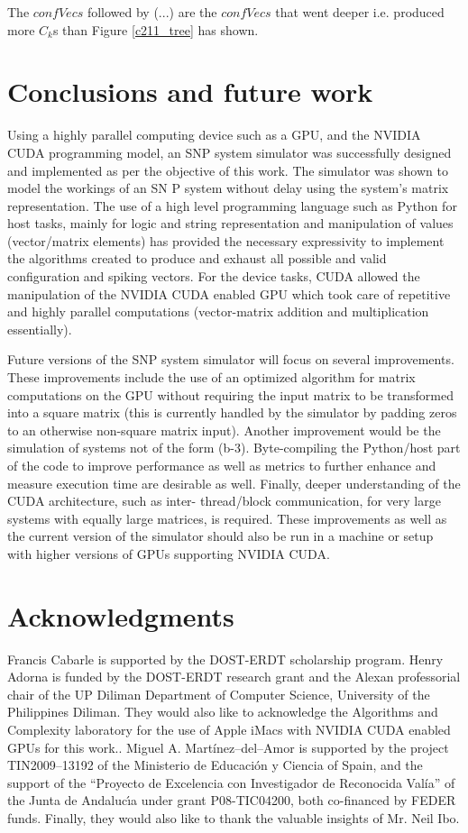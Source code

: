 \documentclass{svmultm}
\begin{document}
The $confVecs$ followed by (...) are the $confVecs$ that went deeper i.e. produced more $C_k$s than Figure \ref{c211_tree} has shown.


\section{Conclusions and future work}
Using a highly parallel computing device such as a  {GPU}, {and the}
 NVIDIA CUDA {programming model}, an SNP system simulator was
successfully designed and implemented as per the objective of this work. The simulator was shown to model the workings of an SN P system without delay using the system's matrix representation. The use of a high
level programming language such as Python for host tasks,
mainly for logic and string representation and manipulation
of values (vector/matrix elements) {has} provided the necessary
expressivity to implement the algorithms created to produce
and exhaust all possible and valid configuration and spiking
vectors. For the device tasks, CUDA allowed the
manipulation of the NVIDIA CUDA enabled  {GPU} which
took care of repetitive and highly parallel computations
({vector-matrix} addition and multiplication essentially).

Future versions of the SNP system simulator will focus on
several improvements. These improvements include the use
of an {optimized} algorithm for matrix computations {on the GPU} without requiring
the input matrix to be transformed into a square matrix (this is
currently handled by the simulator by padding zeros to an
otherwise non-square matrix input). Another improvement
would be the simulation of systems not of the form (b-3).
Byte-compiling the Python/host part of the code to improve
performance as well as metrics to further enhance and
measure execution time are desirable as well. Finally, deeper
understanding of the CUDA architecture, such as inter-
thread/block communication, for very large systems
with equally large matrices, is required. These
improvements as well as the current version of the simulator
should also be run in a machine or setup with higher versions of
 {GPUs} {supporting} NVIDIA CUDA.

\section{ Acknowledgments }
Francis Cabarle is supported by the {DOST-ERDT scholarship program}. Henry Adorna is funded by the {DOST-ERDT research grant} and the Alexan professorial chair of the {UP Diliman Department of Computer Science, University of the Philippines Diliman}. They would also like to acknowledge the {Algorithms and Complexity laboratory} for the use of Apple iMacs with NVIDIA CUDA enabled GPUs for this work.. {Miguel A. Mart\'inez--del--Amor is supported by the project TIN2009--13192 of the Ministerio de Educaci\'on y Ciencia of Spain, and the support of the ``Proyecto de Excelencia con Investigador de Reconocida Val\'ia'' of the Junta de Andaluc\'{\i}a under grant P08-TIC04200, both co-financed by FEDER funds.}
Finally, they would also like to thank the valuable insights of Mr. Neil Ibo.
\end{document}
